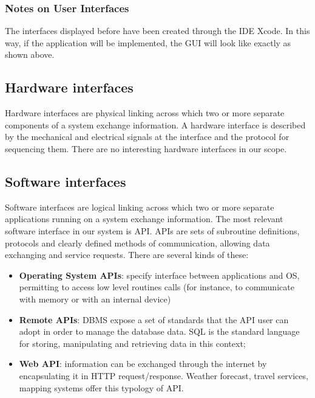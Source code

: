 \subsubsection{Notes on User Interfaces}
The interfaces displayed before have been created through the IDE Xcode. In this way, if the application will be implemented, the GUI will look like exactly as shown above.

\subsection{Hardware interfaces}
Hardware interfaces are physical linking across which two or more separate components of a system exchange information. A hardware interface is described by the mechanical and electrical signals at the interface and the protocol for sequencing them. There are no interesting hardware interfaces in our scope.

\subsection{Software interfaces}
Software interfaces are logical linking across which two or more separate applications running on a system exchange information. The most relevant software interface in our system is API. APIs are sets of subroutine definitions, protocols and clearly defined methods of communication, allowing data exchanging and service requests. There are several kinds of these:
\begin{itemize}
\item \textbf{Operating System APIs}: specify interface between applications and OS, permitting to access low level routines calls (for instance, to communicate with memory or with an internal device)
\item \textbf{Remote APIs}: DBMS expose a set of standards that the API user can adopt in order to manage the database data. SQL is the standard language for storing, manipulating and retrieving data in this context;
\item \textbf{Web API}: information can be exchanged through the internet by encapsulating it in HTTP request/response. Weather forecast, travel services, mapping systems offer this typology of API.
\end{itemize}

